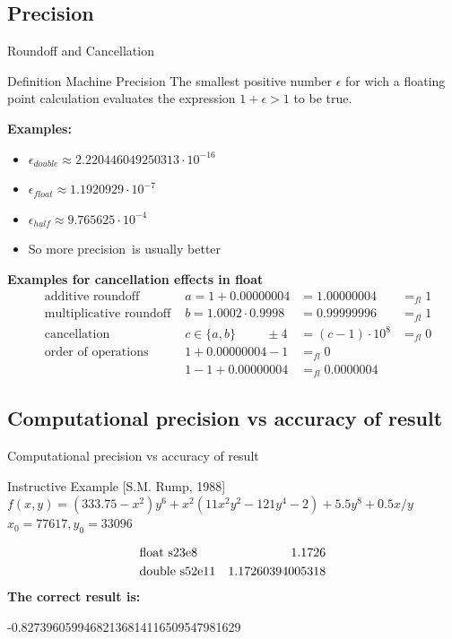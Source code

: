 \documentclass[10pt]{beamer}
\begin{document}
\subsection{Precision}
\begin{frame}{Roundoff and Cancellation}
\begin{block}{Definition Machine Precision}
The smallest positive number $\epsilon$ for wich a floating point 
calculation evaluates the expression $1 + \epsilon > 1$ to be true.
\end{block}
\textbf{Examples:}
\begin{itemize}
\item $\epsilon_{double} \approx 2.220446049250313\cdot 10^{-16}$
\item $\epsilon_{float} \approx 1.1920929\cdot 10^{-7}$
\item $\epsilon_{half} \approx 9.765625\cdot 10^{-4}$
\item So \color{red}more precision\color{black}~is usually \color{red}better
\end{itemize}
\textbf{Examples for cancellation effects in float}
\begin{align*}
&\text{additive roundoff } & a=1+0.00000004 &= 1.00000004 &=_{fl} 1\\
&\text{multiplicative roundoff } & b = 1.0002 \cdot 0.9998 &=0.99999996 &=_{fl} 1\\
&\text{cancellation}  &c\in \lbrace a,b\rbrace 
\hspace{1cm}\pm 4 &= (c-1)\cdot 10^8 &=_{fl} 0 \\
&\text{order~of~operations}  & 1+0.00000004 -1 &=_{fl} 0\\
& &1-1 + 0.00000004 &=_{fl} 0.0000004
\end{align*}
\end{frame}

\subsection{Computational precision vs accuracy of result}
\begin{frame}{Computational precision vs accuracy of result}
\begin{block}{Instructive Example [S.M. Rump, 1988]}
$f(x,y) = (333.75 - x^2)y^6 + x^2(11x^2y^2 - 121y^4-2) + 5.5y^8 + 0.5x/y$\\
$x_0 = 77617, y_0 = 33096$
\end{block}

\begin{align*}
&\text{float s23e8} \hfill &1.1726\\
&\text{double s52e11} \hfill &1.17260394005318\\
\end{align*}
\textbf{The correct result is:}\\
\begin{center}
\color{red}-0.82739605994682136814116509547981629\color{black}
\end{center}
\end{frame}
\end{document}
